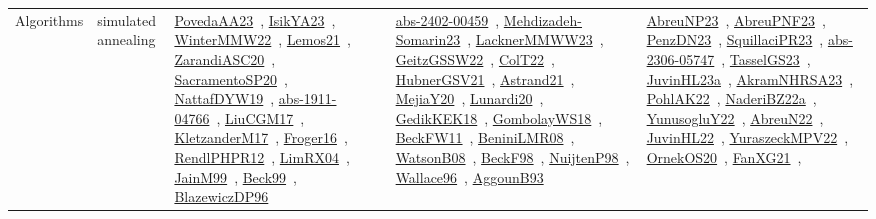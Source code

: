 {\begin{longtable}{lp{3cm}>{\raggedright\arraybackslash}p{6cm}>{\raggedright\arraybackslash}p{6cm}>{\raggedright\arraybackslash}p{8cm}}
Algorithms & simulated annealing & \href{../works/PovedaAA23.pdf}{PovedaAA23}~\cite{PovedaAA23}, \href{../works/IsikYA23.pdf}{IsikYA23}~\cite{IsikYA23}, \href{../works/WinterMMW22.pdf}{WinterMMW22}~\cite{WinterMMW22}, \href{../works/Lemos21.pdf}{Lemos21}~\cite{Lemos21}, \href{../works/ZarandiASC20.pdf}{ZarandiASC20}~\cite{ZarandiASC20}, \href{../works/SacramentoSP20.pdf}{SacramentoSP20}~\cite{SacramentoSP20}, \href{../works/NattafDYW19.pdf}{NattafDYW19}~\cite{NattafDYW19}, \href{../works/abs-1911-04766.pdf}{abs-1911-04766}~\cite{abs-1911-04766}, \href{../works/LiuCGM17.pdf}{LiuCGM17}~\cite{LiuCGM17}, \href{../works/KletzanderM17.pdf}{KletzanderM17}~\cite{KletzanderM17}, \href{../works/Froger16.pdf}{Froger16}~\cite{Froger16}, \href{../works/RendlPHPR12.pdf}{RendlPHPR12}~\cite{RendlPHPR12}, \href{../works/LimRX04.pdf}{LimRX04}~\cite{LimRX04}, \href{../works/JainM99.pdf}{JainM99}~\cite{JainM99}, \href{../works/Beck99.pdf}{Beck99}~\cite{Beck99}, \href{../works/BlazewiczDP96.pdf}{BlazewiczDP96}~\cite{BlazewiczDP96} & \href{../works/abs-2402-00459.pdf}{abs-2402-00459}~\cite{abs-2402-00459}, \href{../works/Mehdizadeh-Somarin23.pdf}{Mehdizadeh-Somarin23}~\cite{Mehdizadeh-Somarin23}, \href{../works/LacknerMMWW23.pdf}{LacknerMMWW23}~\cite{LacknerMMWW23}, \href{../works/GeitzGSSW22.pdf}{GeitzGSSW22}~\cite{GeitzGSSW22}, \href{../works/ColT22.pdf}{ColT22}~\cite{ColT22}, \href{../works/HubnerGSV21.pdf}{HubnerGSV21}~\cite{HubnerGSV21}, \href{../works/Astrand21.pdf}{Astrand21}~\cite{Astrand21}, \href{../works/MejiaY20.pdf}{MejiaY20}~\cite{MejiaY20}, \href{../works/Lunardi20.pdf}{Lunardi20}~\cite{Lunardi20}, \href{../works/GedikKEK18.pdf}{GedikKEK18}~\cite{GedikKEK18}, \href{../works/GombolayWS18.pdf}{GombolayWS18}~\cite{GombolayWS18}, \href{../works/BeckFW11.pdf}{BeckFW11}~\cite{BeckFW11}, \href{../works/BeniniLMR08.pdf}{BeniniLMR08}~\cite{BeniniLMR08}, \href{../works/WatsonB08.pdf}{WatsonB08}~\cite{WatsonB08}, \href{../works/BeckF98.pdf}{BeckF98}~\cite{BeckF98}, \href{../works/NuijtenP98.pdf}{NuijtenP98}~\cite{NuijtenP98}, \href{../works/Wallace96.pdf}{Wallace96}~\cite{Wallace96}, \href{../works/AggounB93.pdf}{AggounB93}~\cite{AggounB93} & \href{../works/AbreuNP23.pdf}{AbreuNP23}~\cite{AbreuNP23}, \href{../works/AbreuPNF23.pdf}{AbreuPNF23}~\cite{AbreuPNF23}, \href{../works/PenzDN23.pdf}{PenzDN23}~\cite{PenzDN23}, \href{../works/SquillaciPR23.pdf}{SquillaciPR23}~\cite{SquillaciPR23}, \href{../works/abs-2306-05747.pdf}{abs-2306-05747}~\cite{abs-2306-05747}, \href{../works/TasselGS23.pdf}{TasselGS23}~\cite{TasselGS23}, \href{../works/JuvinHL23a.pdf}{JuvinHL23a}~\cite{JuvinHL23a}, \href{../works/AkramNHRSA23.pdf}{AkramNHRSA23}~\cite{AkramNHRSA23}, \href{../works/PohlAK22.pdf}{PohlAK22}~\cite{PohlAK22}, \href{../works/NaderiBZ22a.pdf}{NaderiBZ22a}~\cite{NaderiBZ22a}, \href{../works/YunusogluY22.pdf}{YunusogluY22}~\cite{YunusogluY22}, \href{../works/AbreuN22.pdf}{AbreuN22}~\cite{AbreuN22}, \href{../works/JuvinHL22.pdf}{JuvinHL22}~\cite{JuvinHL22}, \href{../works/YuraszeckMPV22.pdf}{YuraszeckMPV22}~\cite{YuraszeckMPV22}, \href{../works/OrnekOS20.pdf}{OrnekOS20}~\cite{OrnekOS20}, \href{../works/FanXG21.pdf}{FanXG21}~\cite{FanXG21}, 
\end{longtable}}
